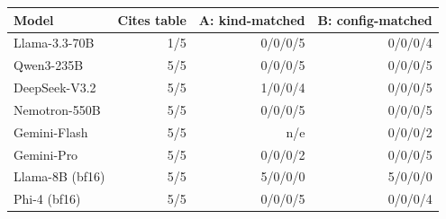 \begin{tabular}{@{}lrrr@{}}
\toprule
Model & Cites table & A: kind-matched & B: config-matched \\
\midrule
Llama-3.3-70B & 1/5 & 0/0/0/5 & 0/0/0/4 \\
Qwen3-235B & 5/5 & 0/0/0/5 & 0/0/0/5 \\
DeepSeek-V3.2 & 5/5 & 1/0/0/4 & 0/0/0/5 \\
Nemotron-550B & 5/5 & 0/0/0/5 & 0/0/0/5 \\
Gemini-Flash & 5/5 & n/e & 0/0/0/2 \\
Gemini-Pro & 5/5 & 0/0/0/2 & 0/0/0/5 \\
Llama-8B (bf16) & 5/5 & 5/0/0/0 & 5/0/0/0 \\
Phi-4 (bf16) & 5/5 & 0/0/0/5 & 0/0/0/4 \\
\bottomrule
\end{tabular}
